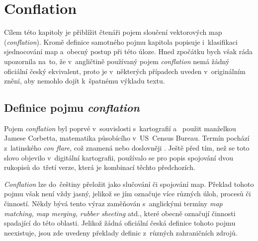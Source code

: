 \chapter{Conflation}
\label{2-conflation}

Cílem této kapitoly je přiblížit čtenáři pojem sloučení vektorových map
(\textit{conflation}). Kromě definice samotného pojmu kapitola popisuje 
i~klasifikaci sjednocování map a~obecný postup při této úloze. Hned zpočátku
bych však ráda upozornila na~to, že v~angličtině používaný pojem 
\textit{conflation} nemá žádný oficiální český ekvivalent, proto je v~některých
případech uveden v~originálním znění, aby nemohlo dojít k~špatnému výkladu 
textu.

\section{Definice pojmu \textit{conflation}}
\label{definice}

Pojem \textit{conflation} byl poprvé v~souvislosti s~kartografií a~
použit manželkou Jamese Corbetta, matematika působícího v~US~Census Bureau.
Termín pochází z~latinského \textit{con flare}, což znamená 
nebo doslovněji . Ještě před tím, než se toto slovo 
objevilo v~digitální kartografii, používalo se pro popis spojování dvou 
rukopisů do~třetí verze, která je kombinací těchto předchozích.

\textit{Conflation} lze do~češtiny přeložit jako slučování či spojování map. 
Překlad tohoto pojmu však není vždy jasný, jelikož se jím označuje více různých 
úloh, procesů či činností. Někdy bývá tento výraz zaměňován s~anglickými 
termíny \textit{map matching, map merging, rubber sheeting} atd., které obecně
označují činnosti spadající do této oblasti. Jelikož žádná oficiální česká
definice tohoto pojmu neexistuje, jsou zde uvedeny překlady definic z~různých 
zahraničních zdrojů. 

